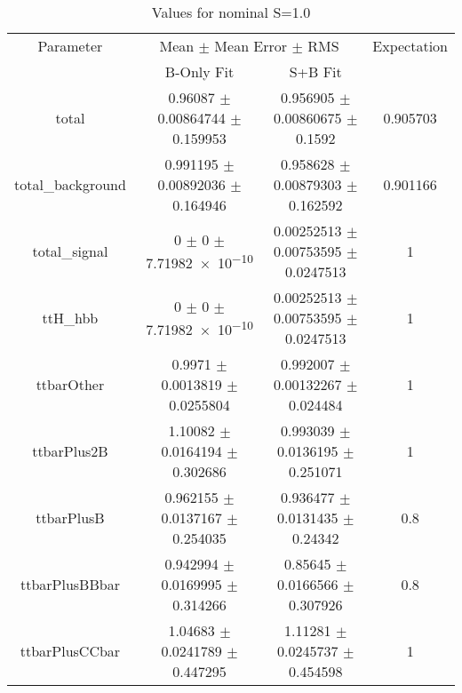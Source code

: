 \begin{table}
\centering
\caption{Values for nominal S=1.0}
\begin{tabular}{cccc}
\toprule
Parameter & \multicolumn{2}{c}{Mean $\pm$ Mean Error $\pm$ RMS} & Expectation\\
 & B-Only Fit & S+B Fit & \\
\midrule
total & \num{0.96087} $\pm$ \num{0.00864744} $\pm$ \num{0.159953} & \num{0.956905} $\pm$ \num{0.00860675} $\pm$ \num{0.1592} & \num{0.905703}\\
total\_background & \num{0.991195} $\pm$ \num{0.00892036} $\pm$ \num{0.164946} & \num{0.958628} $\pm$ \num{0.00879303} $\pm$ \num{0.162592} & \num{0.901166}\\
total\_signal & \num{0} $\pm$ \num{0} $\pm$ \num{7.71982e-10} & \num{0.00252513} $\pm$ \num{0.00753595} $\pm$ \num{0.0247513} & \num{1}\\
ttH\_hbb & \num{0} $\pm$ \num{0} $\pm$ \num{7.71982e-10} & \num{0.00252513} $\pm$ \num{0.00753595} $\pm$ \num{0.0247513} & \num{1}\\
ttbarOther & \num{0.9971} $\pm$ \num{0.0013819} $\pm$ \num{0.0255804} & \num{0.992007} $\pm$ \num{0.00132267} $\pm$ \num{0.024484} & \num{1}\\
ttbarPlus2B & \num{1.10082} $\pm$ \num{0.0164194} $\pm$ \num{0.302686} & \num{0.993039} $\pm$ \num{0.0136195} $\pm$ \num{0.251071} & \num{1}\\
ttbarPlusB & \num{0.962155} $\pm$ \num{0.0137167} $\pm$ \num{0.254035} & \num{0.936477} $\pm$ \num{0.0131435} $\pm$ \num{0.24342} & \num{0.8}\\
ttbarPlusBBbar & \num{0.942994} $\pm$ \num{0.0169995} $\pm$ \num{0.314266} & \num{0.85645} $\pm$ \num{0.0166566} $\pm$ \num{0.307926} & \num{0.8}\\
ttbarPlusCCbar & \num{1.04683} $\pm$ \num{0.0241789} $\pm$ \num{0.447295} & \num{1.11281} $\pm$ \num{0.0245737} $\pm$ \num{0.454598} & \num{1}\\
\bottomrule
\end{tabular}
\end{table}